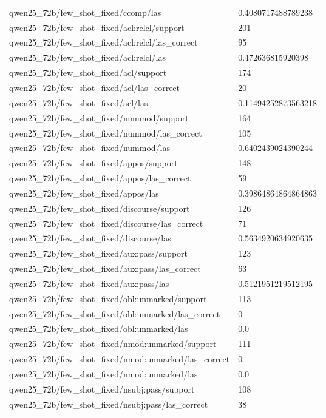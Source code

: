 \begin{tabular}{ll}
qwen25\_72b/few\_shot\_fixed/ccomp/las & 0.4080717488789238 \\
qwen25\_72b/few\_shot\_fixed/acl:relcl/support & 201 \\
qwen25\_72b/few\_shot\_fixed/acl:relcl/las\_correct & 95 \\
qwen25\_72b/few\_shot\_fixed/acl:relcl/las & 0.472636815920398 \\
qwen25\_72b/few\_shot\_fixed/acl/support & 174 \\
qwen25\_72b/few\_shot\_fixed/acl/las\_correct & 20 \\
qwen25\_72b/few\_shot\_fixed/acl/las & 0.11494252873563218 \\
qwen25\_72b/few\_shot\_fixed/nummod/support & 164 \\
qwen25\_72b/few\_shot\_fixed/nummod/las\_correct & 105 \\
qwen25\_72b/few\_shot\_fixed/nummod/las & 0.6402439024390244 \\
qwen25\_72b/few\_shot\_fixed/appos/support & 148 \\
qwen25\_72b/few\_shot\_fixed/appos/las\_correct & 59 \\
qwen25\_72b/few\_shot\_fixed/appos/las & 0.39864864864864863 \\
qwen25\_72b/few\_shot\_fixed/discourse/support & 126 \\
qwen25\_72b/few\_shot\_fixed/discourse/las\_correct & 71 \\
qwen25\_72b/few\_shot\_fixed/discourse/las & 0.5634920634920635 \\
qwen25\_72b/few\_shot\_fixed/aux:pass/support & 123 \\
qwen25\_72b/few\_shot\_fixed/aux:pass/las\_correct & 63 \\
qwen25\_72b/few\_shot\_fixed/aux:pass/las & 0.5121951219512195 \\
qwen25\_72b/few\_shot\_fixed/obl:unmarked/support & 113 \\
qwen25\_72b/few\_shot\_fixed/obl:unmarked/las\_correct & 0 \\
qwen25\_72b/few\_shot\_fixed/obl:unmarked/las & 0.0 \\
qwen25\_72b/few\_shot\_fixed/nmod:unmarked/support & 111 \\
qwen25\_72b/few\_shot\_fixed/nmod:unmarked/las\_correct & 0 \\
qwen25\_72b/few\_shot\_fixed/nmod:unmarked/las & 0.0 \\
qwen25\_72b/few\_shot\_fixed/nsubj:pass/support & 108 \\
qwen25\_72b/few\_shot\_fixed/nsubj:pass/las\_correct & 38 \\

\end{tabular}
